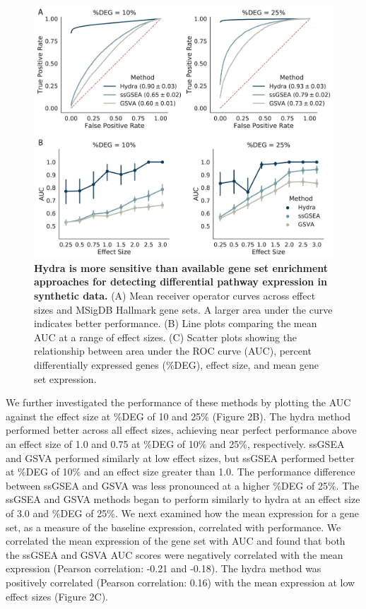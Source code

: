 \documentclass[10pt,letterpaper]{article}
\begin{document}
\begin{figure}[!h]
	\includegraphics[width=\textwidth]{img/ROC-PLOT-2x}
	\caption{{\bf Hydra is more sensitive than available gene set enrichment approaches for detecting differential pathway expression in synthetic data.}
		(A) Mean receiver operator curves across effect sizes and MSigDB Hallmark gene sets. A larger area under the curve indicates better performance. (B) Line plots comparing the mean AUC at a range of effect sizes. (C) Scatter plots showing the relationship between area under the ROC curve (AUC), percent differentially expressed genes (\%DEG), effect size, and mean gene set expression.
		\label{rocplot}}
\end{figure}

We further investigated the performance of these methods by plotting the AUC against the effect size at \%DEG of 10 and 25\% (Figure 2B). The hydra method performed better across all effect sizes, achieving near perfect performance above an effect size of 1.0 and 0.75 at \%DEG of 10\% and 25\%, respectively. ssGSEA and GSVA performed similarly at low effect sizes, but ssGSEA performed better at \%DEG of 10\% and an effect size greater than 1.0. The performance difference between ssGSEA and GSVA was less pronounced at a higher \%DEG of 25\%. The ssGSEA and GSVA methods began to perform similarly to hydra at an effect size of 3.0 and \%DEG of 25\%. We next examined how the mean expression for a gene set, as a measure of the baseline expression, correlated with performance. We correlated the mean expression of the gene set with AUC and found that both the ssGSEA and GSVA AUC scores were negatively correlated with the mean expression (Pearson correlation: -0.21 and -0.18). The hydra method was positively correlated (Pearson correlation: 0.16) with the mean expression at low effect sizes (Figure 2C).
\end{document}
